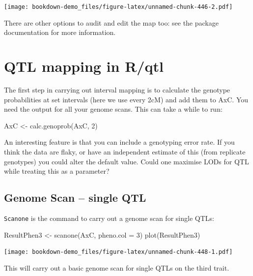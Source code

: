 \documentclass[
]{book}
\newenvironment{Shaded}{\begin{snugshade}}{\end{snugshade}}
\newcommand{\AttributeTok}[1]{\textcolor[rgb]{0.77,0.63,0.00}{#1}}
\newcommand{\DecValTok}[1]{\textcolor[rgb]{0.00,0.00,0.81}{#1}}
\newcommand{\FunctionTok}[1]{\textcolor[rgb]{0.00,0.00,0.00}{#1}}
\newcommand{\NormalTok}[1]{#1}
\newcommand{\OtherTok}[1]{\textcolor[rgb]{0.56,0.35,0.01}{#1}}
\begin{document}
\texttt{[image: bookdown-demo\_files/figure-latex/unnamed-chunk-446-2.pdf]}

There are other options to audit and edit the map too: see the package documentation for more information.

\hypertarget{qtl-mapping-in-rqtl}{%
\section{QTL mapping in R/qtl}\label{qtl-mapping-in-rqtl}}

The first step in carrying out interval mapping is to calculate the genotype probabilities at set intervals (here we use every 2cM) and add them to AxC. You need the output for all your genome scans. This can take a while to run:

\begin{Shaded}
\begin{Highlighting}[]
\NormalTok{AxC }\OtherTok{\textless{}{-}} \FunctionTok{calc.genoprob}\NormalTok{(AxC, }\DecValTok{2}\NormalTok{)}
\end{Highlighting}
\end{Shaded}

An interesting feature is that you can include a genotyping error rate. If you think the data are flaky, or have an independent estimate of this (from replicate genotypes) you could alter the default value. Could one maximise LODs for QTL while treating this as a parameter?

\hypertarget{genome-scan-single-qtl}{%
\subsection{Genome Scan -- single QTL}\label{genome-scan-single-qtl}}

\texttt{Scanone} is the command to carry out a genome scan for single QTLs:

\begin{Shaded}
\begin{Highlighting}[]
\NormalTok{ResultPhen3 }\OtherTok{\textless{}{-}} \FunctionTok{scanone}\NormalTok{(AxC, }\AttributeTok{pheno.col =} \DecValTok{3}\NormalTok{)}
\FunctionTok{plot}\NormalTok{(ResultPhen3)}
\end{Highlighting}
\end{Shaded}

\texttt{[image: bookdown-demo\_files/figure-latex/unnamed-chunk-448-1.pdf]}

This will carry out a basic genome scan for single QTLs on the third trait.
\end{document}
